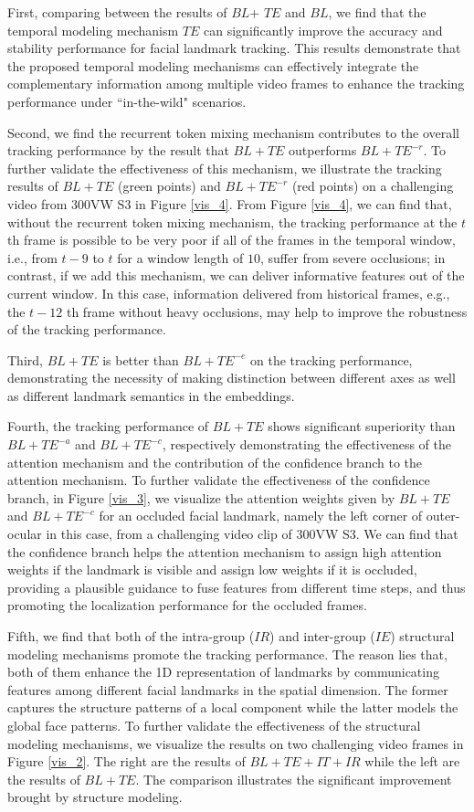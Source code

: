 \documentclass[review]{elsarticle}
\begin{document}
First, comparing between the results of $BL$+ $TE$ and $BL$, we find that the temporal modeling mechanism $TE$ can significantly improve the accuracy and stability performance for facial landmark tracking. This results demonstrate that the proposed temporal modeling mechanisms can effectively integrate the complementary information among multiple video frames to enhance the tracking performance under ``in-the-wild" scenarios. 

Second, we find the recurrent token mixing mechanism contributes to the overall tracking performance by the result that  $BL+TE$ outperforms $BL+TE^{-r}$. To further validate the effectiveness of this mechanism, we illustrate the tracking results of $BL+TE$ (green points) and $BL+TE^{-r}$ (red points) on a challenging video from 300VW S3 in Figure \ref{vis_4}. From Figure \ref{vis_4}, we can find that, without the recurrent token mixing mechanism, the tracking performance at the $t$ th frame is possible to be very poor if all of the frames in the temporal window, i.e., from $t-9$ to $t$ for a window length of $10$, suffer from severe occlusions; in contrast, if we add this mechanism, we can deliver informative features out of the current window. In this case, information delivered from historical frames, e.g., the $t-12$ th frame without heavy occlusions, may help to improve the robustness of the tracking performance. 

Third, $BL+TE$ is better than $BL+TE^{-e}$ on the tracking performance, demonstrating the necessity of making distinction between different axes as well as different landmark semantics in the embeddings. 

Fourth, the tracking performance of $BL+TE$ shows significant superiority than $BL+TE^{-a}$ and $BL+TE^{-c}$, respectively demonstrating the effectiveness of the attention mechanism and the contribution of the confidence branch to the attention mechanism. To further validate the effectiveness of the confidence branch, in Figure \ref{vis_3}, we visualize the attention weights given by $BL+TE$ and $BL+TE^{-c}$  for an occluded facial landmark, namely the left corner of outer-ocular in this case, from a challenging video clip of 300VW S3. We can find that the confidence branch helps the attention mechanism to assign high attention weights if the landmark is visible and assign low weights if it is occluded, providing a plausible guidance to fuse features from different time steps, and thus promoting the localization performance for the occluded frames. 

Fifth, we find that both of the intra-group ($IR$) and inter-group ($IE$) structural modeling mechanisms promote the tracking performance. The reason lies that, both of them enhance the 1D representation of landmarks by communicating features among different facial landmarks in the spatial dimension. The former captures the structure patterns of a local component while the latter models the global face patterns. To further validate the effectiveness of the structural modeling mechanisms, we visualize the results on two challenging video frames in Figure \ref{vis_2}. The right are the results of $BL+TE+IT+IR$ while the left are the results of $BL+TE$. The comparison illustrates the significant improvement brought by structure modeling.
\end{document}
